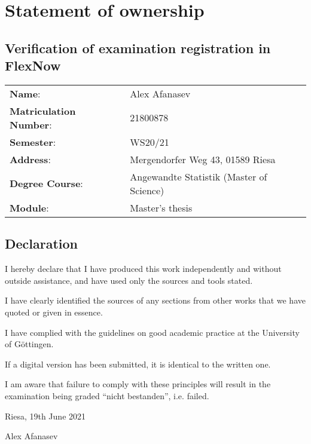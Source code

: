\chapter*{Statement of ownership}

\section*{Verification of examination registration in FlexNow}

\begin{tabular}{ll}
\textbf{Name}: & Alex Afanasev \\
\textbf{Matriculation Number}: & 21800878 \\
\textbf{Semester}: & WS20/21 \\
\textbf{Address}: & Mergendorfer Weg 43, 01589 Riesa \\
\textbf{Degree Course}: & Angewandte Statistik (Master of Science) \\
\textbf{Module}: & Master's thesis
\end{tabular}

\section*{Declaration}

I hereby declare that I have produced this work independently and without
outside assistance, and have used only the sources and tools stated.

I have clearly identified the sources of any sections from other works that we
have quoted or given in essence.

I have complied with the guidelines on good academic practice at the University of Göttingen.

If a digital version has been submitted, it is identical to the written one.

I am aware that failure to comply with these principles will result in the examination being graded “nicht bestanden”, i.e. failed.


Riesa, 19th June 2021

Alex Afanasev
